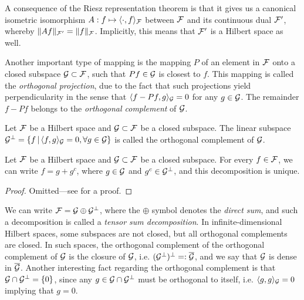 A consequence of the Riesz representation theorem is that it gives us a canonical isometric isomorphism $A:f\mapsto \langle\cdot,f\rangle_{\mathcal F}$ between ${\mathcal F}$ and its continuous dual ${\mathcal F}'$, whereby $\lVert Af\rVert_{{\mathcal F}'} = \lVert f\rVert_{\mathcal F}$.
Implicitly, this means that ${\mathcal F}'$ is a Hilbert space as well.

Another important type of mapping is the mapping $P$ of an element in ${\mathcal F}$ onto a closed subspace ${\mathcal G}\subset{\mathcal F}$, such that $Pf \in {\mathcal G}$ is closest to $f$.
This mapping is called the \emph{orthogonal projection}, due to the fact that such projections yield perpendicularity in the sense that $\langle f-Pf,g\rangle_{\mathcal G} = 0$ for any $g\in{\mathcal G}$.
The remainder $f - Pf$ belongs to the \emph{orthogonal complement} of ${\mathcal G}$.

\begin{definition}
  Let ${\mathcal F}$ be a Hilbert space and ${\mathcal G} \subset {\mathcal F}$ be a closed subspace.
  The linear subspace ${\mathcal G}^\bot = \{ f \,|\, \langle f,g\rangle_{\mathcal G} = 0, \forall g \in {\mathcal G} \}$ is called the orthogonal complement of ${\mathcal G}$.
\end{definition}

\begin{theorem}
  Let ${\mathcal F}$ be a Hilbert space and ${\mathcal G} \subset {\mathcal F}$ be a closed subspace.
  For every $f \in {\mathcal F}$, we can write $f = g + g^c$, where $g \in {\mathcal G}$ and $g^c \in {\mathcal G}^\bot$, and this decomposition is unique.
\end{theorem}

\begin{proof}
  Omitted---see \citet[Theorem 4.11]{rudin1987real} for a proof.
\end{proof}

We can write ${\mathcal F} = {\mathcal G} \oplus {\mathcal G}^\bot$, where the $\oplus$ symbol denotes the \emph{direct sum}, and such a decomposition is called a \emph{tensor sum decomposition}.
In infinite-dimensional Hilbert spaces, some subspaces are not closed, but all orthogonal complements are closed. 
In such spaces, the orthogonal complement of the orthogonal complement of ${\mathcal G}$ is the closure of ${\mathcal G}$, i.e. $({\mathcal G}^\bot)^\bot =: \overline {{\mathcal G}}$, and we say that ${\mathcal G}$ is dense in $\overline {{\mathcal G}}$.
Another interesting fact regarding the orthogonal complement is that ${\mathcal G} \cap {\mathcal G}^\bot = \{ 0 \}$, since any $g\in {\mathcal G} \cap {\mathcal G}^\bot$ must be orthogonal to itself, i.e. $\langle g,g\rangle_{\mathcal G} = 0$ implying that $g=0$.

%

